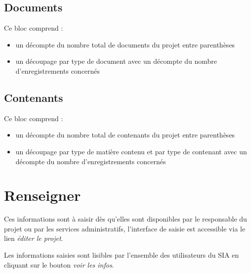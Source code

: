 \documentclass[letterpaper,10pt,french]{sphinxmanual}
\begin{document}
\subsection{Documents}
\label{manuel/formulaire_projet:documents}
Ce bloc comprend :
\begin{itemize}
\item {} 
un décompte du nombre total de documents du projet entre parenthèses

\item {} 
un découpage par type de document avec un décompte du nombre d'enregistrements concernés

\end{itemize}


\subsection{Contenants}
\label{manuel/formulaire_projet:contenants}
Ce bloc comprend :
\begin{itemize}
\item {} 
un décompte du nombre total de contenants du projet entre parenthèses

\item {} 
un découpage par type de matière contenu et par type de contenant avec un décompte du nombre d'enregistrements concernés

\end{itemize}


\section{Renseigner}
\label{manuel/formulaire_projet:renseigner}
Ces informations sont à saisir dès qu'elles sont disponibles par le responsable du projet ou par les services administratifs, l'interface de saisie est accessible via le lien \emph{éditer le projet}.

Les informations saisies sont lisibles par l'ensemble des utilisateurs du SIA en cliquant sur le bouton \emph{voir les infos}.
\end{document}
